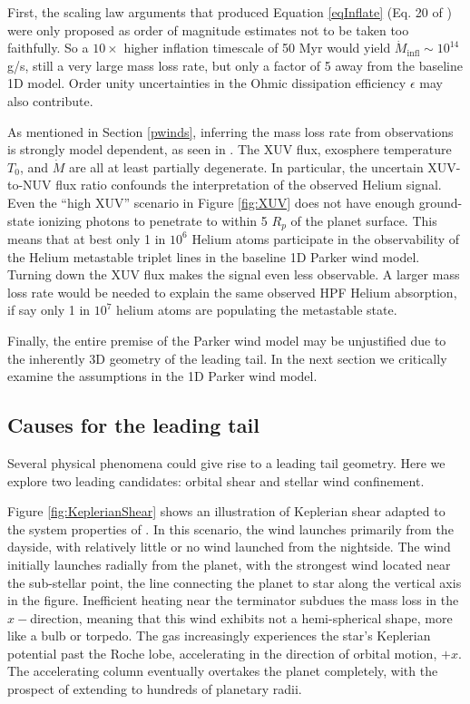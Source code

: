 \documentclass[twocolumn]{aastex631}
\newcommand{\hatpb}{\object{HAT-P-67 b}}
\begin{document}
First, the scaling law arguments that produced Equation \ref{eqInflate} (Eq. 20 of \citet{2011ApJ...738....1B}) were only proposed as order of magnitude estimates not to be taken too faithfully.  So a $10\times$ higher inflation timescale of 50 Myr would yield $\dot{M}_\mathrm{infl}\sim10^{14}$ g/s, still a very large mass loss rate, but only a factor of 5 away from the baseline 1D model.  Order unity uncertainties in the Ohmic dissipation efficiency $\epsilon$ may also contribute.

As mentioned in Section \ref{pwinds}, inferring the mass loss rate from observations is strongly model dependent, as seen in .  The XUV flux, exosphere temperature $T_0$, and $\dot{M}$ are all at least partially degenerate.  In particular, the uncertain XUV-to-NUV flux ratio confounds the interpretation of the observed Helium signal.  Even the ``high XUV'' scenario in Figure \ref{fig:XUV} does not have enough ground-state ionizing photons to penetrate to within 5 $R_p$ of the planet surface.  This means that at best only 1 in $10^{6}$ Helium atoms participate in the observability of the Helium metastable triplet lines in the baseline 1D Parker wind model.  Turning down the XUV flux makes the signal even less observable.  A larger mass loss rate would be needed to explain the same observed HPF Helium absorption, if say only 1 in $10^{7}$ helium atoms are populating the metastable state.

Finally, the entire premise of the Parker wind model may be unjustified due to the inherently 3D geometry of the leading tail.  In the next section we critically examine the assumptions in the 1D Parker wind model.

\subsection{Causes for the leading tail}
Several physical phenomena could give rise to a leading tail geometry.  Here we explore two leading candidates: orbital shear and stellar wind confinement.

Figure \ref{fig:KeplerianShear} shows an illustration of Keplerian shear adapted to the system properties of \hatpb.  In this scenario, the wind launches primarily from the dayside, with relatively little or no wind launched from the nightside.  The wind initially launches radially from the planet, with the strongest wind located near the sub-stellar point, the line connecting the planet to star along the vertical axis in the figure.  Inefficient heating near the terminator subdues the mass loss in the $x-$direction, meaning that this wind exhibits not a hemi-spherical shape, more like a bulb or torpedo.  The gas increasingly experiences the star's Keplerian potential past the Roche lobe, accelerating in the direction of orbital motion, $+x$.  The accelerating column eventually overtakes the planet completely, with the prospect of extending to hundreds of planetary radii.
\end{document}
